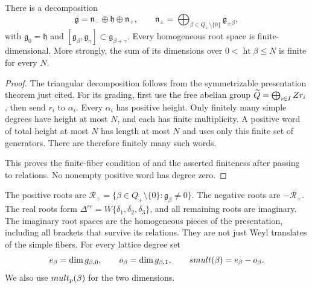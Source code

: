 \begin{lemma}
\label{lem:bkm-triangular-decomposition}
There is a decomposition
\begin{equation}
\label{eq:bkm-triangular}
 \mathfrak g=\mathfrak n_-\oplus\mathfrak h\oplus\mathfrak n_+,
 \qquad
 \mathfrak n_\pm=\bigoplus_{\beta\in Q_+\setminus\{0\}}
                         \mathfrak g_{\pm\beta},
\end{equation}
with $\mathfrak g_0=\mathfrak h$ and
$[\mathfrak g_\beta,\mathfrak g_\gamma]
\subset\mathfrak g_{\beta+\gamma}$. Every homogeneous root space is
finite-dimensional. More strongly, the sum of its dimensions over
$0<\operatorname{ht}\beta\leq N$ is finite for every $N$.
\end{lemma}
\begin{proof}
The triangular decomposition follows from the symmetrizable
presentation theorem just cited. For its grading, first use the free
abelian group $\widetilde Q=\bigoplus_{i\in I}Z r_i$, then send
$r_i$ to $\alpha_i$. Every $\alpha_i$ has positive height. Only
finitely many simple degrees have height at most $N$, and each has
finite multiplicity. A positive word of total height at most $N$
has length at most $N$ and uses only this finite set of generators.
There are therefore finitely many such words.

This proves the
finite-fiber condition of \cite[(6.29)--(6.30)]{GN} and the asserted
finiteness after passing to relations. No nonempty positive word
has degree zero.
\end{proof}

\begin{definition}
\label{def:bkm-full-root-datum}
\label{def:bkm-real-roots}
The positive roots are
$\mathcal R_+=\{\beta\in Q_+\setminus\{0\}:\mathfrak g_\beta\ne0\}$.
The negative roots are $-\mathcal R_+$. The real roots form
$\Delta^{re}=W\{\delta_1,\delta_2,\delta_3\}$, and all remaining
roots are imaginary. The imaginary root spaces are the homogeneous
pieces of the presentation, including all brackets that survive its
relations. They are not just Weyl translates of the simple fibers.
\label{def:bkm-smult}
For every lattice degree set
\begin{equation}
\label{eq:bkm-smult-def}
 e_\beta=\dim g_{\beta,0},\qquad
 o_\beta=\dim g_{\beta,1},\qquad
 smult(\beta)=e_\beta-o_\beta.
\end{equation}
We also use $mult_{p}(\beta)$ for the two dimensions.
\end{definition}

